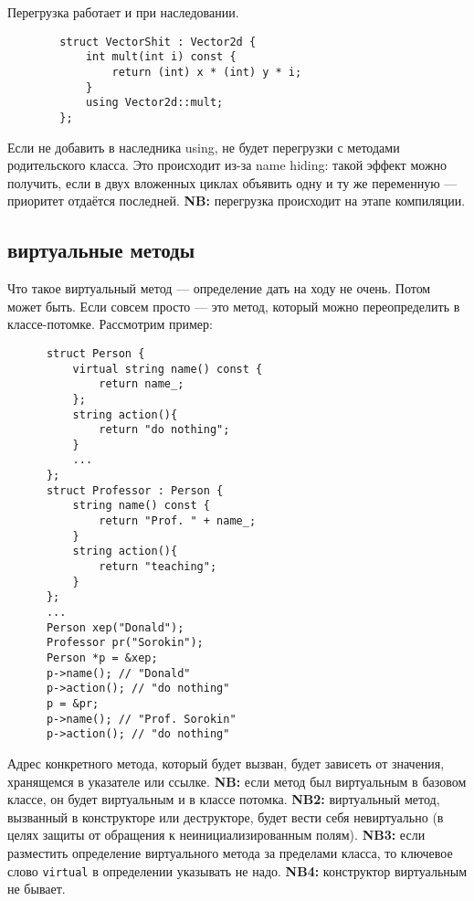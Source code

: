 \documentclass[15pt, a4paper]{article}
\newcommand{\nl}{\newline}
\begin{document}
    Перегрузка работает и при наследовании.
    \begin{verbatim}
        struct VectorShit : Vector2d {
            int mult(int i) const {
                return (int) x * (int) y * i;
            }
            using Vector2d::mult;
        };
    \end{verbatim}
    Если не добавить в наследника using, не будет перегрузки с методами родительского класса. Это происходит из-за name hiding:
    такой эффект можно получить, если в двух вложенных циклах объявить одну и ту же переменную --- приоритет отдаётся последней.\nl
    \textbf{NB:} перегрузка происходит на этапе компиляции.\nl
  \subsection{виртуальные методы}
  Что такое виртуальный метод --- определение дать на ходу не очень. Потом может быть. Если совсем просто --- это метод, который можно переопределить в классе-потомке.\nl
  Рассмотрим пример:
  \begin{verbatim}
      struct Person {
          virtual string name() const {
              return name_;
          };
          string action(){
              return "do nothing";
          }
          ...
      };
      struct Professor : Person {
          string name() const {
              return "Prof. " + name_;
          }
          string action(){
              return "teaching";
          }
      };
      ...
      Person xep("Donald");
      Professor pr("Sorokin");
      Person *p = &xep;
      p->name(); // "Donald"
      p->action(); // "do nothing"
      p = &pr;
      p->name(); // "Prof. Sorokin"
      p->action(); // "do nothing"
  \end{verbatim}
  Адрес конкретного метода, который будет вызван, будет зависеть от значения, хранящемся в указателе или
  ссылке.\nl
  \textbf{NB:} если метод был виртуальным в базовом классе, он будет виртуальным и в классе потомка.\nl
  \textbf{NB2:} виртуальный метод, вызванный в конструкторе или деструкторе, будет вести себя невиртуально (в целях
  защиты от обращения к неинициализированным полям). \nl
  \textbf{NB3:} если разместить определение виртуального метода за пределами класса, то ключевое слово \texttt{virtual} в определении указывать не надо. \nl
  \textbf{NB4:} конструктор виртуальным не бывает.
\end{document}
